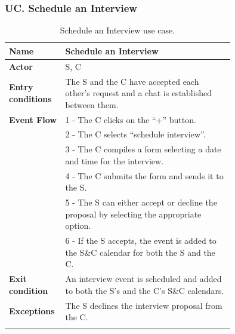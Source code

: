 \subsubsection*{UC\cuc . Schedule an Interview}
\begin{center}
    \begin{longtable}{|l|p{0.75\linewidth}|}
        \hline
        \textbf{Name}               & Schedule an Interview\\
        \hline
        \textbf{Actor}              & S, C\\
        \hline
        \textbf{Entry conditions}   & The S and the C have accepted each other’s request and a chat is established between them.\\
        \hline
        \textbf{Event Flow}         & 1 - The C clicks on the “+” button. \\
        & 2 - The C selects “schedule interview”. \\
        & 3 - The C compiles a form selecting a date and time for the interview. \\
        & 4 - The C submits the form and sends it to the S. \\
        & 5 - The S can either accept or decline the proposal by selecting the appropriate option. \\
        & 6 - If the S accepts, the event is added to the S\&C calendar for both the S and the C. \\
        \hline
        \textbf{Exit condition}   & An interview event is scheduled and added to both the S’s and the C’s S\&C calendars. \\       
        \hline
        \textbf{Exceptions}       & The S declines the interview proposal from the C. \\
        \hline
        \caption{Schedule an Interview use case.}
        \label{tab: schedule_interview_use_case}
    \end{longtable}
\end{center}


